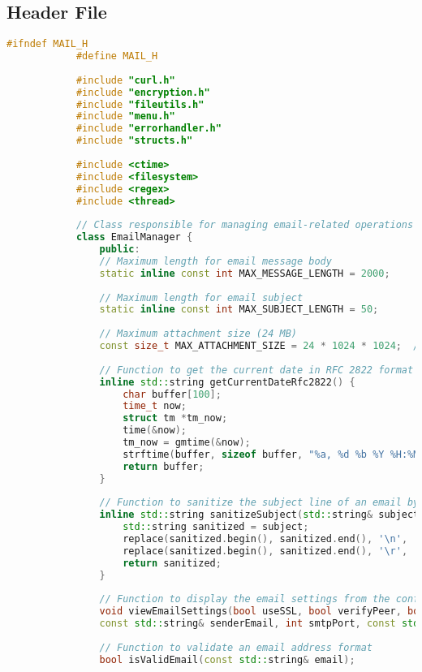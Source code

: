 \documentclass{article}
\begin{document}
	\subsection*{Header File}
	\begin{mdframed}[backgroundcolor=background, hidealllines=false, innerleftmargin=15pt, innerrightmargin=5pt, innertopmargin=0pt, innerbottommargin=-5pt]
		\begin{lstlisting}[language=C++]
			#ifndef MAIL_H
			#define MAIL_H
			
			#include "curl.h"
			#include "encryption.h"
			#include "fileutils.h"
			#include "menu.h"
			#include "errorhandler.h"
			#include "structs.h"
			
			#include <ctime>
			#include <filesystem>
			#include <regex>
			#include <thread>
			
			// Class responsible for managing email-related operations
			class EmailManager {
				public:
				// Maximum length for email message body
				static inline const int MAX_MESSAGE_LENGTH = 2000;
				
				// Maximum length for email subject
				static inline const int MAX_SUBJECT_LENGTH = 50;
				
				// Maximum attachment size (24 MB)
				const size_t MAX_ATTACHMENT_SIZE = 24 * 1024 * 1024;  // 24 MB in bytes
				
				// Function to get the current date in RFC 2822 format
				inline std::string getCurrentDateRfc2822() {
					char buffer[100];
					time_t now;
					struct tm *tm_now;
					time(&now);
					tm_now = gmtime(&now);
					strftime(buffer, sizeof buffer, "%a, %d %b %Y %H:%M:%S %Z", tm_now);
					return buffer;
				}
				
				// Function to sanitize the subject line of an email by replacing newline and carriage return characters with spaces
				inline std::string sanitizeSubject(std::string& subject) {
					std::string sanitized = subject;
					replace(sanitized.begin(), sanitized.end(), '\n', ' '); // replace newlines with spaces
					replace(sanitized.begin(), sanitized.end(), '\r', ' '); // replace carriage returns with spaces
					return sanitized;
				}
				
				// Function to display the email settings from the configuration file
				void viewEmailSettings(bool useSSL, bool verifyPeer, bool verifyHost, bool verbose,  
				const std::string& senderEmail, int smtpPort, const std::string& smtpServer);
				
				// Function to validate an email address format
				bool isValidEmail(const std::string& email);
				

\end{lstlisting}
\end{mdframed}
\end{document}
